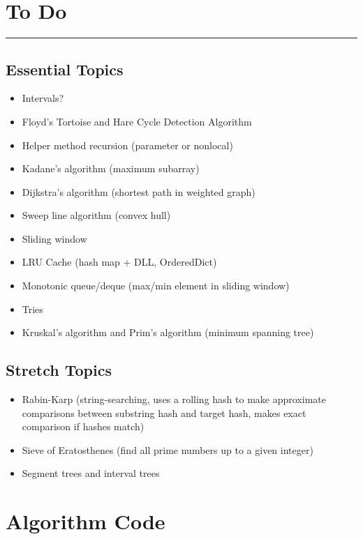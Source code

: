 \documentclass[12pt, titlepage]{article}
\begin{document}
\section{To Do}
\hrule\vspace{5ex}

\subsection{Essential Topics}
\begin{itemize}
  \item Intervals?
  \item Floyd's Tortoise and Hare Cycle Detection Algorithm
  \item Helper method recursion (parameter or nonlocal)
  \item Kadane's algorithm (maximum subarray)
  \item Dijkstra's algorithm (shortest path in weighted graph)
  \item Sweep line algorithm (convex hull)
  \item Sliding window
  \item LRU Cache (hash map + DLL, OrderedDict)
  \item Monotonic queue/deque (max/min element in sliding window) %
  \item Tries
  \item Kruskal's algorithm and Prim's algorithm (minimum spanning tree)
\end{itemize}

\subsection{Stretch Topics}
\begin{itemize}
  \item Rabin-Karp (string-searching, uses a rolling hash to make approximate comparisons between substring hash and target hash, makes exact comparison if hashes match)
  \item Sieve of Eratosthenes (find all prime numbers up to a given integer)
  \item Segment trees and interval trees
\end{itemize}

\appendix

\section{Algorithm Code}
\end{document}
